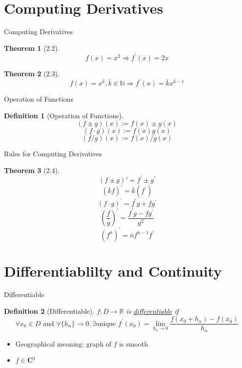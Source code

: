 \documentclass[final]{beamer}
\newtheorem{defn}{Definition}
\newtheorem{thm}{Theorem}
\begin{document}
\section{Computing Derivatives} %
\label{sec:computing_derivatives}

\begin{frame}[t]{Computing Derivatives}
	\begin{thm}
		[2.2]
		\[
			f(x)=x^2 \Rightarrow f^\prime (x) = 2x
		\]
	\end{thm}

	\begin{thm}
		[2.3]
		\[
			f(x)=x^{\bar k} , \bar k \in \mathbb{N} \Rightarrow f^\prime (x) = \bar k x^{\bar k - 1}
		\]
	\end{thm}
\end{frame}

\begin{frame}[t]{Operation of Functions}
	\begin{defn}
		[Operation of Functions]
		\[
			(f\pm g)(x) := f(x)\pm g(x)
		\]
		\[
			(f\cdot g)(x) := f(x)g(x)
		\]\[
			(f/g)(x) := f(x)/g(x)
		\]
	\end{defn}
\end{frame}

\begin{frame}[t]{Rules for Computing Derivatives}
	\begin{thm}
		[2.4]
		\[
			(f\pm g)\prime = f^\prime \pm g^\prime
		\]\[
			(\bar k f)^\prime = \bar k (f^\prime)
		\]\[
			(f\cdot g)^\prime = f^\prime g + f g^\prime 
		\]\[
			\left(\frac{f}{g}\right)^\prime = \frac{f^\prime g - fg^\prime}{g^2}
		\]\[
			(f^{\bar n})^\prime = \bar n f^{\bar n - 1} f^\prime 
		\]
	\end{thm}
\end{frame}


\section{Differentiablilty and Continuity} %
\label{sec:differentiablilty_and_continuity}
\begin{frame}[t]{Differentiable}
	\begin{defn}
		[Differentiable]
		$f:D\rightarrow \mathbb{R}$ is \uline{differentiable} if \[
			\forall x_0\in D\text{ and }\forall\{h_n\}\rightarrow 0, \exists \text{unique } f^\prime(x_0) = \lim_{h_n\rightarrow 0}\frac{f(x_0+h_n)-f(x_0)}{h_n}
		\]
	\end{defn}
	\begin{itemize}
		\item Geographical meaning: graph of $f$ is smooth
		\item $f\in \mathbf{C}^1$
	\end{itemize}
\end{frame}
\end{document}
